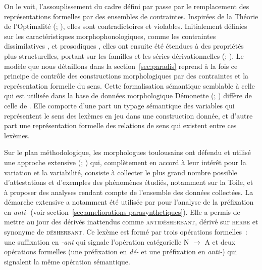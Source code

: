 \documentclass[output=paper]{langsci/langscibook}
\begin{document}
On le voit, l'assouplissement du cadre défini par \cite{Fradin03} passe par le remplacement des représentations formelles par des ensembles de contraintes. Inspirées de la Théorie de l'Optimalité (\citealt{prince1993.optimality-theory}; \citealt{mccarthy1993.prosodic-morphology}), elles sont contradictoires et violables.  Initialement définies sur les caractéristiques morphophonologiques, comme les contraintes dissimilatives \citep{plenat2011.dumal}, et prosodiques \citep{Plenat2009}, elles ont ensuite été étendues à des propriétés plus structurelles, portant sur les familles et les séries dérivationnelles (\citealt{hathout2011.dumal}; \citealt{roche2014.CMLF}).  Le modèle \paradis{} que nous détaillons dans la section~\ref{sec:paradis} reprend à la fois ce principe de contrôle des constructions morphologiques par des contraintes et la représentation formelle du sens.  Cette formalisation sémantique semblable à celle qui est utilisée dans la base de données morphologique Démonette (\citealt{hathout2014.LiLT}; \citealt{hathout2016.lrec-demonette})  diffère de celle de \citet{Fradin03}. Elle comporte d'une part un typage sémantique des variables qui représentent le sens des lexèmes en jeu dans une construction donnée, et d'autre part une représentation formelle des relations de sens qui existent entre ces lexèmes.

Sur le plan méthodologique, les morphologues toulousains ont défendu et utilisé une approche extensive (\citealt{plenat2002.pichon}; \citealt{hathout2003.cdg,Hathout2008,Hathout2009}) qui, complètement en accord à leur intérêt pour la variation et la variabilité, consiste à collecter le plus grand nombre possible d'attestations et d'exemples des phénomènes étudiés, notamment sur la Toile, et à proposer des analyses rendant compte de l'ensemble des données collectées.  La démarche extensive a notamment été utilisée par \cite{Hathout2009,hathout2011.dumal} pour l'analyse de la préfixation en \emph{\mbox{anti-}} (voir section~\ref{sec:ameliorations-parasynthetiques}).  Elle a permis de mettre au jour des dérivés inattendus comme \textsc{antidésherbant}, dérivé sur \textsc{herbe} et synonyme de \textsc{désherbant}.  Ce lexème est formé par trois opérations formelles~: une suffixation en \emph{\mbox{-ant}} qui signale l'opération catégorielle N $\rightarrow$ A et deux opérations formelles (une préfixation en \emph{\mbox{dé-}} et une préfixation en \emph{\mbox{anti-}}) qui signalent la même opération sémantique.
\end{document}
